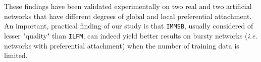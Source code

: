\documentclass[9pt,twocolumn,twoside]{pnas-new}
\newcommand{\ifm}{\texttt{ILFM}}
\newcommand{\imb}{\texttt{IMMSB}}
\begin{document}
These findings have been validated experimentally on two real and two artificial networks that have different degrees of global and local preferential attachment. An important, practical finding of our study is that \imb, usually considered of lesser "quality" than \ifm, can indeed yield better results on bursty networks (\textit{i.e.} networks with preferential attachment) when the number of training data is limited.



\end{document}
